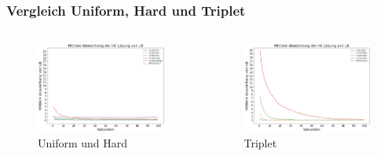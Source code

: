 \documentclass{beamer}
\begin{document}
\begin{frame}
\frametitle{Vergleich Uniform, Hard und Triplet}


\begin{columns}[c] %

\begin{figure}[!htbp]
\includegraphics[scale=0.2]{img/unif_hard_time_vergleich.png}
\caption{Uniform und Hard}
\label{fig:architecture}
\end{figure}


\begin{figure}[!htbp]
\includegraphics[scale=0.2]{img/triplet_time.png}
\caption{Triplet}
\label{fig:architecture}
\end{figure}


\end{columns}
\end{frame}
\end{document}
